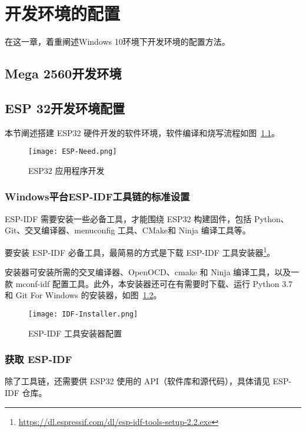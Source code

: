 \chapter{开发环境的配置}
\label{cha:Environment}

在这一章，着重阐述Windows 10环境下开发环境的配置方法。

\section{Mega 2560开发环境}


\section{ESP 32开发环境配置}

本节阐述搭建 ESP32 硬件开发的软件环境，软件编译和烧写流程如图~\ref{fig:ESP-Need}。

\begin{figure}[htbp]
    \centering
    \texttt{[image: ESP-Need.png]}
    \caption{ESP32 应用程序开发}
    \label{fig:ESP-Need}
\end{figure}

\subsection{Windows平台ESP-IDF工具链的标准设置}

ESP-IDF 需要安装一些必备工具，才能围绕 ESP32 构建固件，包括 Python、Git、交叉编译器、menuconfig 工具、CMake和 Ninja 编译工具等。

要安装 ESP-IDF 必备工具，最简易的方式是下载 ESP-IDF 工具安装器\footnote{\url{https://dl.espressif.com/dl/esp-idf-tools-setup-2.2.exe}}。

安装器可安装所需的交叉编译器、OpenOCD、cmake 和 Ninja 编译工具，以及一款 mconf-idf 配置工具。此外，本安装器还可在有需要时下载、运行 Python 3.7 和 Git For Windows 的安装器，如图~\ref{fig:IDF-Installer}。

\begin{figure}[htbp]
    \centering
    \texttt{[image: IDF-Installer.png]}
    \caption{ESP-IDF 工具安装器配置}
    \label{fig:IDF-Installer}
\end{figure}

\subsection{获取 ESP-IDF}

除了工具链，还需要供 ESP32 使用的 API（软件库和源代码），具体请见 ESP-IDF 仓库。

